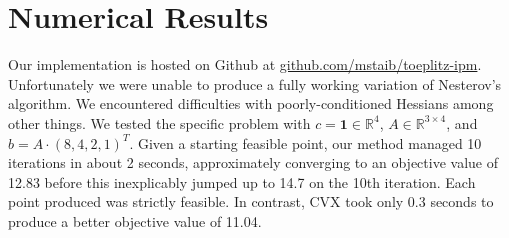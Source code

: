 \documentclass{article}
\begin{document}
\section{Numerical Results}
Our implementation is hosted on Github at \url{github.com/mstaib/toeplitz-ipm}.
Unfortunately we were unable to produce a fully working variation of Nesterov's
algorithm. We encountered difficulties with poorly-conditioned Hessians among
other things. We tested the specific problem with $c = \mathbf 1 \in \mathbb
R^4$, $A \in \mathbb R^{3\times 4}$, and $b = A \cdot (8,4,2,1)^T$. Given a
starting feasible point, our method managed 10 iterations in about 2 seconds,
approximately converging to an objective value of 12.83 before this
inexplicably jumped up to 14.7 on the 10th iteration. Each point produced was
strictly feasible. In contrast, CVX took only 0.3 seconds to produce a better
objective value of 11.04.
\end{document}
